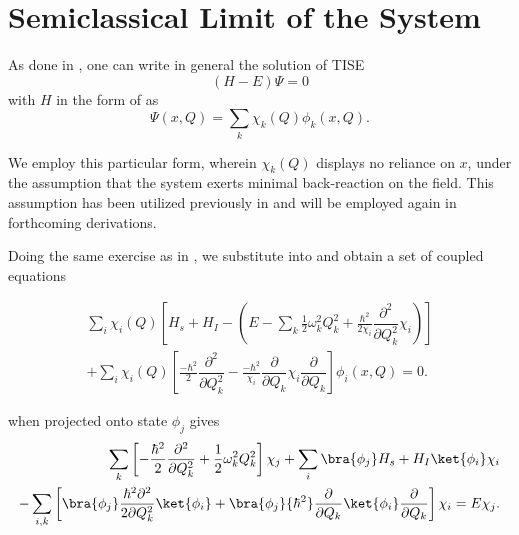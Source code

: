 \section{Semiclassical Limit of the System\label{sec:class_jcm_sec1}}
As done in , one can write in general the solution of 
TISE 
\begin{equation}
    \label{eq:class_jcm_eq2}
    (H - E)\Psi = 0
\end{equation}
with $H$ in the form of  as 
\begin{equation}
    \label{eq:class_jcm_eq3}
    \Psi(x, Q) = \sum_{k} \chi_k(Q) \phi_k(x, Q).
\end{equation}

We employ this particular form, wherein $\chi_k(Q)$ displays no reliance on $x$, 
under the assumption that the system exerts minimal back-reaction on the field.
This assumption has been utilized previously in  
and will be employed again in forthcoming derivations.

Doing the same exercise as in , we substitute
 into  and obtain a set of coupled equations

\begin{align}
    \label{eq:class_jcm_eq4}
   \sum_i \chi_i(Q) \left[H_s + H_I - \left(E - \sum_k
    \frac{1}{2}\omega_k^2 Q_k^2 + \frac{\hbar^2}{2\chi_i}\dfrac{\partial^2}{\partial Q_k^2}
    \chi_i\right) \right]\nonumber \\
    + \sum_i \chi_i(Q) \left[
        \frac{-\hbar^2}{2}\dfrac{\partial^2}{\partial Q_k^2} - 
        \frac{-\hbar^2}{\chi_i}\dfrac{\partial}{\partial Q_k}\chi_i\dfrac{\partial}{\partial Q_k}
    \right]\phi_i (x, Q) = 0.
\end{align}

 when projected onto state \(\phi_j\) gives
\begin{align}
    \label{eq:class_jcm_eq5}
    \sum_k \left[-\frac{\hbar^2}{2}\dfrac{\partial^2}{\partial Q_k^2}
     + \frac{1}{2} \omega_k^2 Q_k^2 \right]\chi_j
    + \sum_i \bra{\phi_j}H_s + H_I\ket{\phi_i}\chi_i \nonumber \\
   - \sum_{i, k} \left[
    \bra{\phi_j}\frac{\hbar^2 \partial^2}{2 \partial Q_k^2}\ket{\phi_i}
    + \bra{\phi_j}{\hbar^2}\dfrac{\partial}{\partial Q_k}\ket{\phi_i}\dfrac{\partial}{\partial Q_k}
   \right]\chi_i = E \chi_j.
\end{align}


